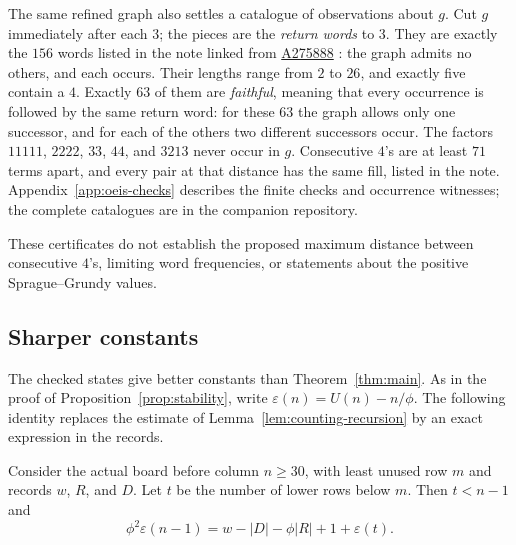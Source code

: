 The same refined graph also settles a catalogue of observations about
$g$. Cut $g$ immediately after each $3$; the pieces are the
\emph{return words} to $3$. They are exactly the $156$ words listed in
the note linked from \href{https://oeis.org/A275888}{A275888}
\cite{OEISWords}: the graph admits no others, and each occurs. Their
lengths range from $2$ to $26$, and exactly five contain a $4$.
Exactly $63$ of them are \emph{faithful}, meaning that every
occurrence is followed by the same return word: for these $63$ the
graph allows only one successor, and for each of the others two
different successors occur. The factors $11111$, $2222$, $33$, $44$,
and $3213$ never occur in $g$. Consecutive $4$'s are at least $71$
terms apart, and every pair at that distance has the same fill,
listed in the note. Appendix~\ref{app:oeis-checks} describes the
finite checks and occurrence witnesses; the complete catalogues are
in the companion repository.

These certificates do not establish the proposed maximum distance
between consecutive $4$'s, limiting word frequencies, or statements
about the positive Sprague--Grundy values.

\subsection{Sharper constants}\label{sec:sharper}
The checked states give better constants than
Theorem~\ref{thm:main}. As in the proof of
Proposition~\ref{prop:stability}, write $\varepsilon(n)=U(n)-n/\phi$.
The following identity replaces the estimate of
Lemma~\ref{lem:counting-recursion} by an exact expression in the
records.

\begin{lemma}\label{lem:exact-recursion}
Consider the actual board before column $n\ge30$, with least unused
row $m$ and records $w$, $R$, and $D$. Let $t$ be the number of lower
rows below $m$. Then $t<n-1$ and
\begin{equation}\label{eq:exact-recursion}
 \phi^2\varepsilon(n-1)=w-|D|-\phi|R|+1+\varepsilon(t).
\end{equation}
\end{lemma}

